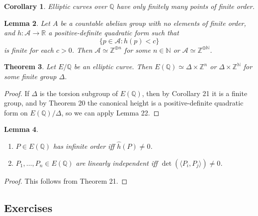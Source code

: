 \documentclass[a4paper]{article}
\theoremstyle{plain}
\newtheorem{theorem}{Theorem}
\newtheorem{lemma}[theorem]{Lemma}
\newtheorem{corollary}[theorem]{Corollary}
\theoremstyle{remark}
\theoremstyle{definition}
\newcommand{\A}{\mathcal{A}}
\newcommand{\N}{\mathbb{N}}
\newcommand{\Z}{\mathbb{Z}}
\newcommand{\Q}{\mathbb{Q}}
\newcommand{\R}{\mathbb{R}}
\begin{document}
\begin{corollary}
    Elliptic curves over $\Q$ have only finitely many points of finite order.
\end{corollary}

\begin{lemma}
    Let $A$ be a countable abelian group with no elements of finite order, and
    $h:\A\to\R$ a positive-definite quadratic form such that
    \begin{equation*}
        \{p\in\A:h(p)<c\}
    \end{equation*}
    is finite for each $c>0$. Then $\A\simeq\Z^{\oplus n}$ for some $n\in\N$ or
    $\A\simeq\Z^{\oplus\N}$.
\end{lemma}

\begin{theorem}
    Let $E/\Q$ be an elliptic curve. Then $E(\Q)\simeq\Delta\times\Z^n$ or
    $\Delta\times\Z^\N$ for some finite group $\Delta$.
\end{theorem}

\begin{proof}
    If $\Delta$ is the torsion subgroup of $E(\Q)$, then by Corollary 21 it is a
    finite group, and by Theorem 20 the canonical height is a positive-definite
    quadratic form on $E(\Q)/\Delta$, so we can apply Lemma 22.
\end{proof}

\begin{lemma}
    ~
    \begin{enumerate}[label=(\roman*)]
        \item $P\in E(\Q)$ has infinite order iff $\hat h(P)\ne0$.
        \item $P_1,\ldots,P_n\in E(\Q)$ are linearly independent iff
            $\det(\langle P_i,P_j\rangle)\ne0$.
    \end{enumerate}
\end{lemma}

\begin{proof}
    This follows from Theorem 21.
\end{proof}

\subsection*{Exercises}
\end{document}
